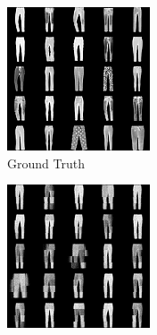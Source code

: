 \begin{figure}[H]
    \centering
    \begin{subfigure}[b]{0.24\textwidth}
        \centering
        \includegraphics[width=\textwidth]{figures/einsum/fashion-mnist/1fashion-mnist_ground_truth.png}
        \caption{Ground Truth}
    \end{subfigure}
    \begin{subfigure}[b]{0.24\textwidth}
        \centering
        \includegraphics[width=\textwidth]{figures/einsum/fashion-mnist/1fashion-mnist_EM.png}

\end{subfigure}
\end{figure}

